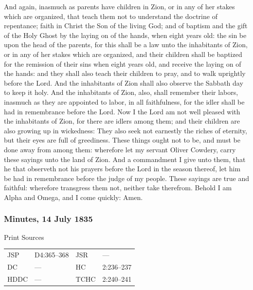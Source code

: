 				And again, inasmuch as parents have children in Zion, or in any of her stakes which are organized, that teach them not to understand the doctrine of repentance; faith in Christ the Son of the living God; and of baptism and the gift of the Holy Ghost by the laying on of the hands, when eight years old: the sin be upon the head of the parents, for this shall be a law unto the inhabitants of Zion, or in any of her stakes which are organized, and their children shall be baptized for the remission of their sins when eight years old, and receive the laying on of the hands: and they shall also teach their children to pray, and to walk uprightly before the Lord. And the inhabitants of Zion shall also observe the Sabbath day to keep it holy. And the inhabitants of Zion, also, shall remember their labors, inasmuch as they are appointed to labor, in all faithfulness, for the idler shall be had in remembrance before the Lord. Now I the Lord am not well pleased with the inhabitants of Zion, for there are idlers among them; and their children are also growing up in wickedness: They also seek not earnestly the riches of eternity, but their eyes are full of greediness. These things ought not to be, and must be done away from among them: wherefore let my servant Oliver Cowdery, carry these sayings unto the land of Zion. And a commandment I give unto them, that he that observeth not his prayers before the Lord in the season thereof, let him be had in remembrance before the judge of my people. These sayings are true and faithful: wherefore transgress them not, neither take therefrom. Behold I am Alpha and Omega, and I come quickly: Amen.
				
		\subsubsection{Minutes, 14 July 1835}
			\label{EMS-1835-JS-14-JUL-1835}
			
			\begin{description}
				\item[Print Sources]
			\end{description}

				\begin{tabular}{p{0.5in}p{1in}p{0.5in}p{1in}}
				JSP	 	& D4:365--368		& JSR 		& --- \\
				DC	 	& --- 				& HC 		& 2:236--237 \\
				HDDC 	& ---				& TCHC 		& 2:240--241 \\
				\end{tabular}
			
